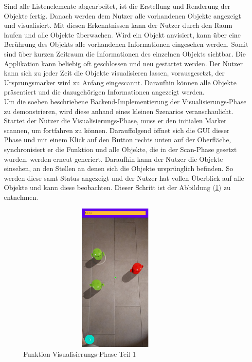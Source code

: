 Sind alle Listenelemente abgearbeitet, ist die Erstellung und Renderung der Objekte fertig. Danach werden dem Nutzer alle vorhandenen Objekte angezeigt und 
visualisiert. Mit diesen Erkenntnissen kann der Nutzer durch den Raum laufen und alle Objekte überwachen. Wird ein Objekt anvisiert, kann über eine Berührung 
des Objekts alle vorhandenen Informationen eingesehen werden. Somit sind über kurzen Zeitraum die Informationen des einzelnen Objekts sichtbar.  
Die Applikation kann beliebig oft geschlossen und neu gestartet werden. Der Nutzer kann sich zu jeder Zeit die Objekte visualisieren lassen, vorausgesetzt, der 
Ursprungsmarker wird zu Anfang eingescannt. Daraufhin können alle Objekte präsentiert und die dazugehörigen Informationen angezeigt werden. %
\\ 
\linebreak
Um die soeben beschriebene Backend-Implementierung der Visualisierungs-Phase zu demonstrieren, wird diese anhand eines kleinen Szenarios veranschaulicht. 
\\ 
Startet der Nutzer die Visualisierungs-Phase, muss er den initialen Marker scannen, um fortfahren zu können. Darauffolgend öffnet sich die \acs{GUI} dieser 
Phase und mit einem Klick auf den Button rechts unten auf der Oberfläche, synchronisiert er die Funktion und alle Objekte, die in der Scan-Phase gesetzt wurden, 
werden erneut generiert. Daraufhin kann der Nutzer die Objekte einsehen, an den Stellen an denen sich die Objekte ursprünglich befinden. So werden diese samt Status 
angezeigt und der Nutzer hat vollen Überblick auf alle Objekte und kann diese beobachten. Dieser Schritt ist der Abbildung (\ref{pic:visual_objects}) 
zu entnehmen. 
\begin{figure}[hbt!]
    \centering
    \includegraphics[width=10cm,height=7.5cm,keepaspectratio]{4Umsetzung/Bilder/show_objects_after_loading.jpg}
    \caption{Funktion Visualisierungs-Phase Teil 1}
    \label{pic:visual_objects}
\end{figure}
